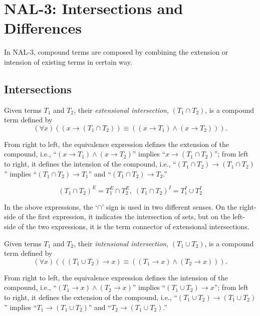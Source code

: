 \chapter{NAL-3: Intersections and Differences}

In NAL-3, compound terms are composed by combining the extension or intension of existing terms in certain way.

\section{Intersections}

\begin{defi}
Given terms $T_1$ and $T_2$, their {\em extensional intersection}, \((T_1 \cap T_2)\), is a compound term defined by
\[(\forall x) ((x \rightarrow (T_1 \cap T_2)) \equiv ((x  \rightarrow T_1) \wedge (x \rightarrow T_2))).\]
\end{defi}
From right to left, the equivalence expression defines the extension of the compound, i.e., ``\((x \rightarrow T_1) \wedge (x \rightarrow T_2)\)'' implies ``\(x \rightarrow (T_1 \cap T_2)\)''; from left to right, it defines the intension of the compound, i.e., ``\((T_1 \cap T_2) \rightarrow (T_1 \cap T_2)\)'' implies ``\((T_1 \cap T_2) \rightarrow T_1\)'' and ``\((T_1 \cap T_2) \rightarrow T_2\).''

\begin{theo}
\[(T_1 \cap T_2)^E = T_1^E \cap T_2^E, \; (T_1 \cap T_2)^I = T_1^I \cup T_2^I\]
\end{theo}
In the above expressions, the `$\cap$' sign is used in two different senses.  On the right-side of the first expression, it indicates the intersection of sets, but on the left-side of the two expressions, it is the term connector of extensional intersections.

\begin{defi}
Given terms $T_1$ and $T_2$, their {\em intensional intersection}, \((T_1 \cup T_2)\), is a compound term defined by
\[(\forall x) (((T_1 \cup T_2) \rightarrow x) \equiv ((T_1 \rightarrow x) \wedge (T_2 \rightarrow x))).\]
\end{defi}
From right to left, the equivalence expression defines the intension of the compound, i.e., ``\((T_1 \rightarrow x) \wedge (T_2 \rightarrow x)\)'' implies ``\((T_1 \cup T_2) \rightarrow x\)''; from left to right, it defines the extension of the compound, i.e., ``\((T_1 \cup T_2) \rightarrow (T_1 \cup T_2)\)'' implies ``\(T_1 \rightarrow (T_1 \cup T_2)\)'' and ``\(T_2 \rightarrow (T_1 \cup T_2)\).''

